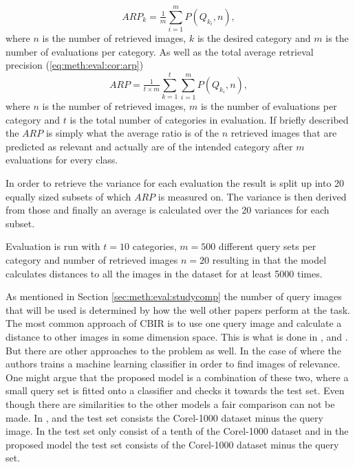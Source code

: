 \begin{equation}
\label{eq:meth:eval:cor:class_arp}
ARP_k = \tfrac{1}{m}\sum_{i=1}^{m}P(Q_{k_i}, n),
\end{equation}
where $n$ is the number of retrieved images, $k$ is the desired category and $m$ is the number of evaluations per category.
As well as the total average retrieval precision (\ref{eq:meth:eval:cor:arp})
\begin{equation}
\label{eq:meth:eval:cor:arp}
ARP = \tfrac{1}{t\times m}\sum_{k=1}^{t}\sum_{i=1}^{m}P(Q_{k_i}, n),
\end{equation}
where $n$ is the number of retrieved images, $m$ is the number of evaluations per category and $t$ is the total number of categories in evaluation. 
If briefly described the $ARP$ is simply what the average ratio is of the $n$ retrieved images that are predicted as relevant and actually are of the intended category after $m$ evaluations for every class.

In order to retrieve the variance for each evaluation the result is split up into 20 equally sized subsets of which $ARP$ is measured on. The variance is then derived from those and finally an average is calculated over the 20 variances for each subset. 

Evaluation is run with $t=10$ categories, $m=500$ different query sets per category and number of retrieved images $n=20$ resulting in that the model calculates distances to all the images in the dataset for at least 5000 times.

As mentioned in Section \ref{sec:meth:eval:studycomp} the number of query images that will be used is determined by how the well other papers perform at the task. The most common approach of CBIR is to use one query image and calculate a distance to other images in some dimension space. This is what is done in \cite{wang2001simplicity}, \cite{subrahmanyam2013modified} and \cite{nagaraja2015low}. But there are other approaches to the problem as well. In the case of \cite{elalami2014new} where the authors trains a machine learning classifier in order to find images of relevance. One might argue that the proposed model is a combination of these two, where a small query set is fitted onto a classifier and checks it towards the test set. Even though there are similarities to the other models a fair comparison can not be made. In \cite{wang2001simplicity}, \cite{subrahmanyam2013modified} and \cite{nagaraja2015low} the test set consists the Corel-1000 dataset minus the query image. In \cite{elalami2014new} the test set only consist of a tenth of the Corel-1000 dataset and in the proposed model the test set consists of the Corel-1000 dataset minus the query set.
